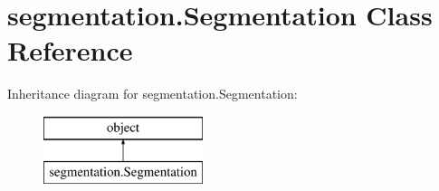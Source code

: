 \hypertarget{classsegmentation_1_1_segmentation}{}\section{segmentation.\+Segmentation Class Reference}
\label{classsegmentation_1_1_segmentation}
Inheritance diagram for segmentation.\+Segmentation\+:\begin{figure}[H]
\begin{center}
\leavevmode
\includegraphics[height=2.000000cm]{classsegmentation_1_1_segmentation}
\end{center}
\end{figure}
